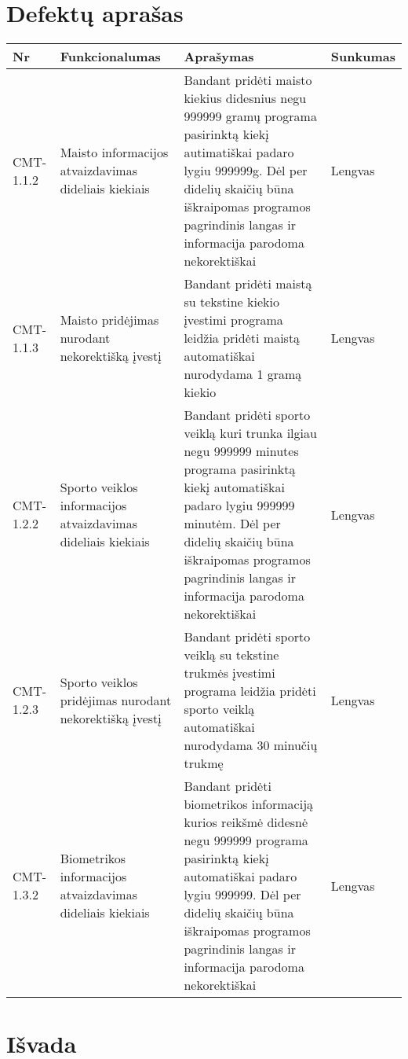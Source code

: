 \documentclass[oneside]{VUMIFPSkursinis}
\begin{document}
\section{Defektų aprašas}
\begin{center}
    \begin{tabular}{ |p{1cm}| p{7cm} | p{7cm} | p{2cm} |}
    \hline
    Nr &  Funkcionalumas & Aprašymas & Sunkumas \\ \hline
    CMT-1.1.2 & Maisto informacijos atvaizdavimas dideliais kiekiais & Bandant pridėti maisto kiekius didesnius negu 999999 gramų programa pasirinktą kiekį autimatiškai padaro lygiu 999999g. Dėl per didelių skaičių būna iškraipomas programos pagrindinis langas ir informacija parodoma nekorektiškai & Lengvas \\ \hline
    CMT-1.1.3 & Maisto pridėjimas nurodant nekorektišką įvestį & Bandant pridėti maistą su tekstine kiekio įvestimi programa leidžia pridėti maistą automatiškai nurodydama 1 gramą kiekio & Lengvas \\ \hline
    CMT-1.2.2 & Sporto veiklos informacijos atvaizdavimas dideliais kiekiais & Bandant pridėti sporto veiklą kuri trunka ilgiau negu 999999 minutes programa pasirinktą kiekį automatiškai padaro lygiu 999999 minutėm. Dėl per didelių skaičių būna iškraipomas programos pagrindinis langas ir informacija parodoma nekorektiškai & Lengvas \\ \hline
    CMT-1.2.3 & Sporto veiklos pridėjimas nurodant nekorektišką įvestį & Bandant pridėti sporto veiklą su tekstine trukmės įvestimi programa leidžia pridėti sporto veiklą automatiškai nurodydama 30 minučių trukmę & Lengvas \\ \hline
    CMT-1.3.2 & Biometrikos informacijos atvaizdavimas dideliais kiekiais & Bandant pridėti biometrikos informaciją kurios reikšmė didesnė negu 999999 programa pasirinktą kiekį automatiškai padaro lygiu 999999. Dėl per didelių skaičių būna iškraipomas programos pagrindinis langas ir informacija parodoma nekorektiškai & Lengvas \\ \hline
   


    \hline
    \end{tabular}
\end{center}

\section{Išvada}

	
\end{document}
